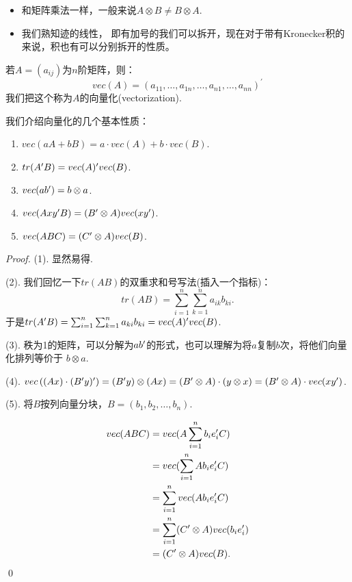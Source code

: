 \begin{remark}
	\begin{itemize}[$\bullet$]
		\item 和矩阵乘法一样，一般来说$A \otimes B \neq B \otimes A$.
		\item 我们熟知迹的线性， 即有加号的我们可以拆开，现在对于带有Kronecker积的来说，积也有可以分别拆开的性质。
	\end{itemize}
\end{remark}

\begin{definition}[Vectorization向量化]
	若$A=(a_{ij})$为$n$阶矩阵，则：
	$$
		vec(A) = (a_{11},\dots,a_{1n},\dots,a_{n1},\dots,a_{nn})^\prime
	$$
	我们把这个称为$A$的向量化(vectorization).
\end{definition}

我们介绍向量化的几个基本性质：
\begin{proposition}
	\begin{enumerate}[(1)]
		\item $vec(aA+bB) = a \cdot vec(A) + b \cdot vec(B)$.
		\item $tr( A^{\prime} B) = vec(A)^\prime vec(B)$.
		\item $vec(a b^{\prime}) = b \otimes a$.
		\item $vec(A xy^{\prime} B) = (B^{\prime} \otimes A) vec(xy^{\prime})$.
		\item $vec(ABC) = (C^{\prime} \otimes A) vec(B)$.
	\end{enumerate}
\end{proposition}

\begin{proof}
	(1). 显然易得.

	(2). 我们回忆一下$tr(AB)$的双重求和号写法(插入一个指标)：
	$$
		tr(AB) = \sum_{i=1}^n \sum_{k=1}^n a_{ik} b_{ki}.
	$$
	于是$tr(A^{\prime}B) = \sum_{i=1}^n \sum_{k=1}^n a_{ki} b_{ki} = vec(A)^\prime vec(B)$.

	(3). 秩为1的矩阵，可以分解为$a b^{\prime}$的形式，也可以理解为将$a$复制$b$次，将他们向量化排列等价于
	$b \otimes a$.

	(4). $vec\left( (Ax) \cdot (B^{\prime} y)^\prime \right) = (B^{\prime} y) \otimes (Ax)= (B^{\prime} \otimes A) \cdot (y \otimes x)= (B^{\prime} \otimes A) \cdot vec(x y^{\prime})$.

	(5). 将$B$按列向量分块，$B=(b_1, b_2,\dots,b_n)$.

	\begin{align*}
		vec(ABC) &= vec(A \sum_{i=1}^n b_i e_i^{\prime} C) \\
		&= vec(\sum_{i=1}^n A b_i e_i^{\prime} C) \\
		&= \sum_{i=1}^n vec(A b_i e_i^{\prime} C) \\
		&= \sum_{i=1}^n (C^{\prime} \otimes A) vec(b_i e_i^{\prime}) \\
		&= (C^{\prime} \otimes A) vec(B).
	\end{align*}
	\qed{}
\end{proof}

